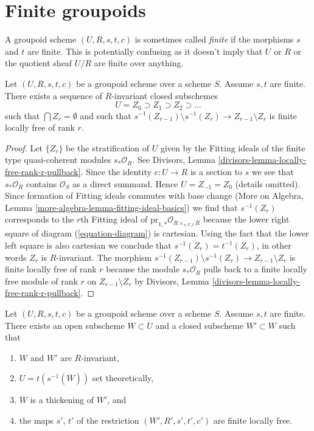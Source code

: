 \section{Finite groupoids}
\label{section-finite-groupoids}

\noindent
A groupoid scheme $(U, R, s, t, c)$ is sometimes called {\it finite} if the
morphisms $s$ and $t$ are finite. This is potentially confusing as it doesn't
imply that $U$ or $R$ or the quotient sheaf $U/R$ are finite over anything.

\begin{lemma}
\label{lemma-finite-stratify}
Let $(U, R, s, t, c)$ be a groupoid scheme over a scheme $S$. Assume $s, t$
are finite. There exists a sequence of $R$-invariant closed subschemes
$$
U = Z_0 \supset Z_1 \supset Z_2 \supset \ldots
$$
such that $\bigcap Z_r = \emptyset$ and such that
$s^{-1}(Z_{r - 1}) \setminus s^{-1}(Z_r) \to Z_{r - 1} \setminus Z_r$
is finite locally free of rank $r$.
\end{lemma}

\begin{proof}
Let $\{Z_r\}$ be the stratification of $U$ given by the Fitting ideals
of the finite type quasi-coherent modules $s_*\mathcal{O}_R$. See
Divisors, Lemma \ref{divisors-lemma-locally-free-rank-r-pullback}.
Since the identity $e : U \to R$ is a section to $s$ we see that
$s_*\mathcal{O}_R$ contains $\mathcal{O}_S$ as a direct summand.
Hence $U = Z_{-1} = Z_0$ (details omitted).
Since formation of Fitting ideals commutes with base change
(More on Algebra, Lemma \ref{more-algebra-lemma-fitting-ideal-basics})
we find that $s^{-1}(Z_r)$ corresponds to the $r$th Fitting ideal
of $\text{pr}_{1, *}\mathcal{O}_{R \times_{s, U, t} R}$ because
the lower right square of diagram (\ref{equation-diagram}) is cartesian.
Using the fact that the lower left square is also cartesian we conclude
that $s^{-1}(Z_r) = t^{-1}(Z_r)$, in other words $Z_r$ is $R$-invariant.
The morphism
$s^{-1}(Z_{r - 1}) \setminus s^{-1}(Z_r) \to Z_{r - 1} \setminus Z_r$
is finite locally free of rank $r$ because the module
$s_*\mathcal{O}_R$ pulls back to a finite locally free module of rank $r$
on $Z_{r - 1} \setminus Z_r$ by
Divisors, Lemma \ref{divisors-lemma-locally-free-rank-r-pullback}.
\end{proof}

\begin{lemma}
\label{lemma-finite-flat-over-almost-dense-subscheme}
Let $(U, R, s, t, c)$ be a groupoid scheme over a scheme $S$. Assume $s, t$
are finite. There exists an open subscheme $W \subset U$ and a closed
subscheme $W' \subset W$ such that
\begin{enumerate}
\item $W$ and $W'$ are $R$-invariant,
\item $U = t(s^{-1}(\overline{W}))$ set theoretically,
\item $W$ is a thickening of $W'$, and
\item the maps $s'$, $t'$ of the restriction $(W', R', s', t', c')$
are finite locally free.
\end{enumerate}
\end{lemma}

